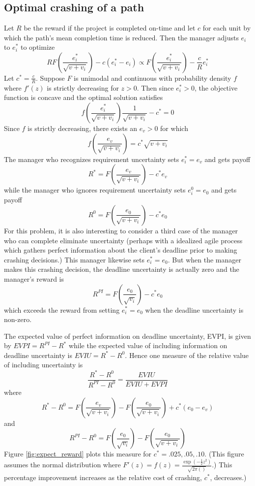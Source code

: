 \documentclass[11pt]{article}
\begin{document}
\subsection{Optimal crashing of a path}
Let $R$ be the reward if the project is completed on-time and let $c$ for each unit by which the path's mean completion time is reduced. Then the manager adjusts $e_i$ to $e^*_i$ to optimize
 $$R F(\frac{e^*_i}{\sqrt{v+v_i}}) - c (e^*_i-e_i) \propto
  F(\frac{e^*_i}{\sqrt{v+v_i}}) - \frac{c}{R} e^*_i $$
  Let $c^*=\frac{c}{R}$.
  Suppose $F$ is unimodal and continuous with probability density $f$ where $f'(z)$ is strictly decreasing for $z>0$.   Then since $e^*_i>0$, the objective function is concave and the optimal solution satisfies $$  f(\frac{e^*_i}{\sqrt{v+v_i}}) \frac{1}{\sqrt{v+v_i}} -c^* =0 $$
Since $f$ is strictly decreasing, there exists an $e_v>0$ for which
$$f(\frac{e_v}{\sqrt{v+v_i}}) =c^* \sqrt{v+v_i}   $$
The manager who recognizes requirement uncertainty sets $e^*_i=e_{v}$ and gets payoff
$$R^*= F(\frac{e_v}{\sqrt{v+v_i}}) - c^* e_v $$
while the manager who ignores requirement uncertainty sets $e^0_i=e_{0}$ and gets payoff
$$R^0=F(\frac{e_{0}}{\sqrt{v+v_i}}) - c^* e_0 $$
For this problem, it is also interesting to consider a third case of the manager who can complete eliminate uncertainty (perhaps with a idealized agile process which gathers perfect information about the client's deadline prior to making crashing decisions.) This manager likewise sets $e^*_i=e_0$.  But when the manager makes this crashing decision, the deadline uncertainty is actually zero and the manager's reward is
$$R^{PI}=F(\frac{e_0}{\sqrt{v_i}} )-c^* e_0 $$
which exceeds the reward from setting $e^*_i=e_0$ when the deadline uncertainty is non-zero.\par
The expected value of perfect information on deadline uncertainty, EVPI, is given by
$EVPI= R^{PI}-R^*$ while the expected value of including information on deadline uncertainty is
$EVIU=R^*-R^0$.   Hence one measure of the relative value of including uncertainty is   $$\frac{R^*-R^0}{R^{PI}-R^0}  
= \frac{EVIU}{EVIU + EVPI}   $$
where
$$R^*-R^0= F(\frac{e_v}{\sqrt{v+v_i}})-F(\frac{e_0}{\sqrt{v+v_i}})+c^*(e_0-e_v) $$
and
$$R^{PI}-R^0= F(\frac{e_0}{\sqrt{v_i}})-F(\frac{e_0}{\sqrt{v+v_i}}) 
$$
Figure \ref{fig:expect_reward} plots this measure for $c^*=.025,.05,.10$.  (This figure assumes the normal distribution where
$F'(z)=f(z)=\frac{\exp(-\frac{1}{2}z^2)}{\sqrt{2 \pi()}}$.) This percentage improvement increases as the relative cost of crashing, $c^*$, decreases.) 
\end{document}
